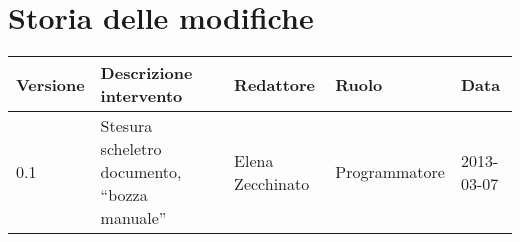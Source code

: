 \newcommand{\docName}{ManualeUtente}
\newcommand{\docFileName}{manuale_utente.1.0.pdf}
\newcommand{\docVers}{1.0}
\newcommand{\creationDate}{2013-03-07}
\newcommand{\modificationDate}{2013-03-07}
\newcommand{\docState}{Non approvato}
\newcommand{\docUsage}{Esterno}
\newcommand{\docDistributionList}{Prof. Tullio Vardanega\\ & Prof. Riccardo Cardin}
\newcommand{\docAuthors}{Elena Zecchinato}
\newcommand{\approvedBy}{Andrea Rizzi}
\newcommand{\verifiedBy}{---}
\newcommand{\docRoot}{..}
\def\INDICETABELLE{true}
\def\INDICEFIGURE{true}



\usepackage[italian]{varioref}





\section*{Storia delle modifiche}
\begin{longtable}{lp{}lll}
\toprule
Versione & Descrizione intervento & Redattore & Ruolo & Data\\
\midrule %

0.1 & Stesura scheletro documento, ``bozza manuale'' & Elena Zecchinato & Programmatore & 2013-03-07\\
\bottomrule
\end{longtable}
\newpage

